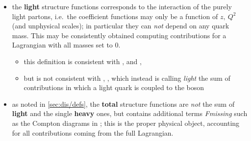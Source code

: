\begin{itemize}
\item the \textbf{light} structure functions corresponds to the interaction of
  the purely light partons, i.e.\ the coefficient functions may only be a
  function of $z,~Q^2$ (and unphysical scales); in particular they can
  \textit{not} depend on any quark mass.
  This may be consistently obtained computing contributions for a Lagrangian
  with all masses set to $0$.
  \begin{itemize}
    \item this definition is consistent with
      \cite{Vermaseren:2005qc,Moch:2004xu,Moch:1999eb,Moch:2007rq,Moch:2008fj},
      and \qcdnum, \cite{Botje:2010ay}
    \item but is not consistent with \apfel, \cite{Bertone:2013vaa}, which
      instead is calling \textit{light} the sum of contributions in which a
      light quark is coupled to the \ew boson
  \end{itemize}

\item as noted in \cref{sec:dis/defs}, the \textbf{total} structure functions
  are \textit{not} the sum of \textbf{light} and the single \textbf{heavy}
  ones, but contains additional terms \textit{Fmissing} such as the Compton
  diagrams in \cite{Hekhorn:2019nlf}; this is the proper physical object,
  accounting for all contributions coming from the full Lagrangian.


\end{itemize}

